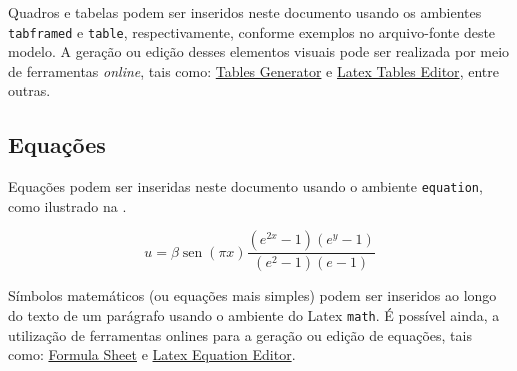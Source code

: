 Quadros e tabelas podem ser inseridos neste documento usando os ambientes \texttt{tabframed} e \texttt{table}, respectivamente, conforme exemplos no arquivo-fonte deste modelo. A geração ou edição desses elementos visuais pode ser realizada por meio de ferramentas \textit{online}, tais como: \href{http://www.tablesgenerator.com/}{Tables Generator} e \href{http://www.latex-tables.com/}{Latex Tables Editor}, entre outras.

\subsection*{Equações}

Equações podem ser inseridas neste documento usando o ambiente  \texttt{equation}, como ilustrado na .

\begin{equation}%
\label{eq:u}
u = \beta \operatorname{sen} \left(\pi x\right) \frac{\left(e^{2x} - 1\right) \left(e^y - 1\right)}{\left(e^2 - 1\right) \left(e - 1\right)}
\end{equation}

Símbolos matemáticos (ou equações mais simples) podem ser inseridos ao longo do texto de um parágrafo usando o ambiente do Latex \texttt{math}. É possível ainda, a utilização de ferramentas onlines para a geração ou edição de equações, tais como: \href{http://formulasheet.com/}{Formula Sheet} e \href{http://www.tutorialspoint.com/latex_equation_editor.htm}{Latex Equation Editor}.

